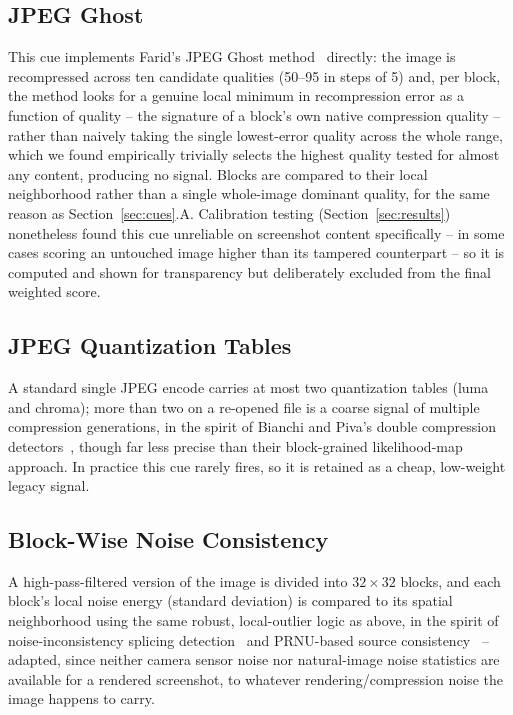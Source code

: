 \documentclass[conference]{IEEEtran}
\begin{document}
\subsection{JPEG Ghost}
This cue implements Farid's JPEG Ghost method~\cite{farid2009ghosts}
directly: the image is recompressed across ten candidate qualities
(50--95 in steps of 5) and, per block, the method looks for a genuine local
minimum in recompression error as a function of quality -- the signature of a
block's own native compression quality -- rather than naively taking the
single lowest-error quality across the whole range, which we found
empirically trivially selects the highest quality tested for almost any
content, producing no signal. Blocks are compared to their local
neighborhood rather than a single whole-image dominant quality, for the same
reason as Section~\ref{sec:cues}.A. Calibration testing
(Section~\ref{sec:results}) nonetheless found this cue unreliable on
screenshot content specifically -- in some cases scoring an untouched image
higher than its tampered counterpart -- so it is computed and shown for
transparency but deliberately excluded from the final weighted score.

\subsection{JPEG Quantization Tables}
A standard single JPEG encode carries at most two quantization tables (luma
and chroma); more than two on a re-opened file is a coarse signal of multiple
compression generations, in the spirit of Bianchi and Piva's double
compression detectors~\cite{bianchi2012block,bianchi2012nonaligned}, though
far less precise than their block-grained likelihood-map approach. In
practice this cue rarely fires, so it is retained as a cheap, low-weight
legacy signal.

\subsection{Block-Wise Noise Consistency}
A high-pass-filtered version of the image is divided into $32\times32$
blocks, and each block's local noise energy (standard deviation) is compared
to its spatial neighborhood using the same robust, local-outlier logic as
above, in the spirit of noise-inconsistency splicing
detection~\cite{lyu2014exposing} and PRNU-based source
consistency~\cite{lukas2006digital} -- adapted, since neither camera sensor
noise nor natural-image noise statistics are available for a rendered
screenshot, to whatever rendering/compression noise the image happens to
carry.
\end{document}
